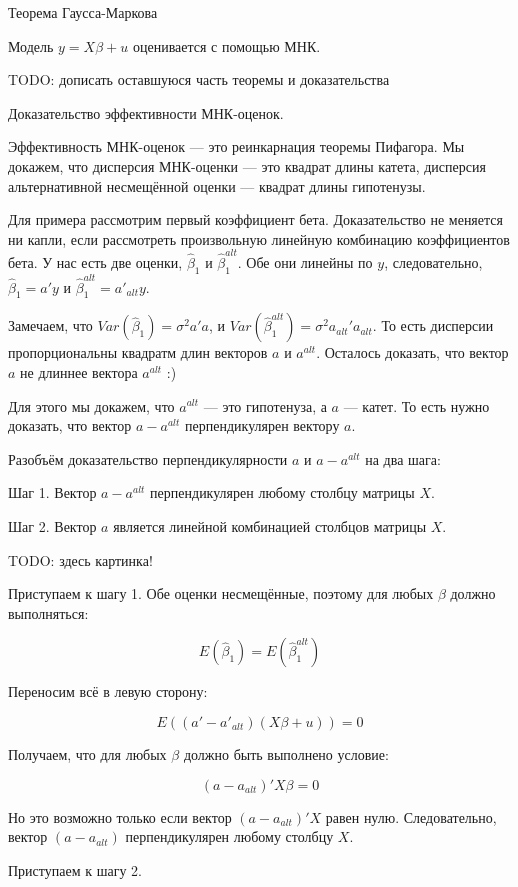 \documentclass[11pt,russian,]{book}
\begin{document}
Теорема Гаусса-Маркова

Модель \(y = X\beta + u\) оценивается с помощью МНК.

TODO: дописать оставшуюся часть теоремы и доказательства

Доказательство эффективности МНК-оценок.

Эффективность МНК-оценок --- это реинкарнация теоремы Пифагора.
Мы докажем, что дисперсия МНК-оценки --- это квадрат длины катета,
дисперсия альтернативной несмещённой оценки --- квадрат длины гипотенузы.

Для примера рассмотрим первый коэффициент бета. Доказательство не меняется ни капли, если рассмотреть произвольную линейную комбинацию коэффициентов бета.
У нас есть две оценки, \(\hat\beta_1\) и \(\hat\beta_1^{alt}\). Обе они линейны по \(y\),
следовательно, \(\hat\beta_1 = a'y\) и \(\hat\beta_1^{alt} = a'_{alt} y\).

Замечаем, что \(Var(\hat\beta_1) = \sigma^2 a'a\), и \(Var(\hat\beta_1^{alt}) = \sigma^2 a_{alt}'a_{alt}\). То есть дисперсии пропорциональны квадратм длин векторов \(a\) и \(a^{alt}\).
Осталось доказать, что вектор \(a\) не длиннее вектора \(a^{alt}\) :)

Для этого мы докажем, что \(a^{alt}\) --- это гипотенуза, а \(a\) --- катет. То есть нужно доказать, что вектор \(a - a^{alt}\) перпендикулярен вектору \(a\).

Разобъём доказательство перпендикулярности \(a\) и \(a-a^{alt}\) на два шага:

Шаг 1. Вектор \(a - a^{alt}\) перпендикулярен любому столбцу матрицы \(X\).

Шаг 2. Вектор \(a\) является линейной комбинацией столбцов матрицы \(X\).

TODO: здесь картинка!

Приступаем к шагу 1. Обе оценки несмещённые, поэтому для любых \(\beta\) должно выполняться:

\[
E(\hat\beta_1) = E(\hat\beta_1^{alt})
\]

Переносим всё в левую сторону:

\[
E((a' - a'_{alt})(X\beta + u)) = 0
\]

Получаем, что для любых \(\beta\) должно быть выполнено условие:

\[
(a - a_{alt})'X\beta = 0
\]

Но это возможно только если вектор \((a - a_{alt})'X\) равен нулю.
Следовательно, вектор \((a - a_{alt})\) перпендикулярен любому столбцу \(X\).

Приступаем к шагу 2.
\end{document}
